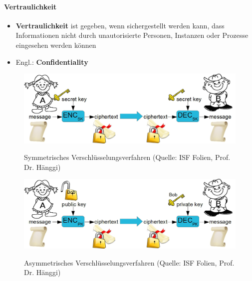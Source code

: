 \paragraph*{Vertraulichkeit}\label{par:Confidentiality}
\begin{itemize}
    \item \textbf{Vertraulichkeit} ist gegeben, wenn sichergestellt werden kann, dass Informationen nicht durch unautorisierte Personen, Instanzen oder Prozesse eingesehen werden können
    \item Engl.: \textbf{Confidentiality}
\end{itemize}
\begin{figure}[H]
    \begin{center}
    \label{pic:SymmetricEncryption}
    \includegraphics[width=.9\textwidth]{images/secretkey.png}
    \caption{Symmetrisches Verschlüsselungsverfahren (Quelle: ISF Folien, Prof. Dr. Hänggi)}
    \end{center}
\end{figure}
\begin{figure}[H]
    \begin{center}
    \label{pic:AsymmetricEncryption}
    \includegraphics[width=.9\textwidth]{images/publickey.png}
    \caption{Asymmetrisches Verschlüsselungsverfahren (Quelle: ISF Folien, Prof. Dr. Hänggi)}
    \end{center}
\end{figure}

\pagebreak
